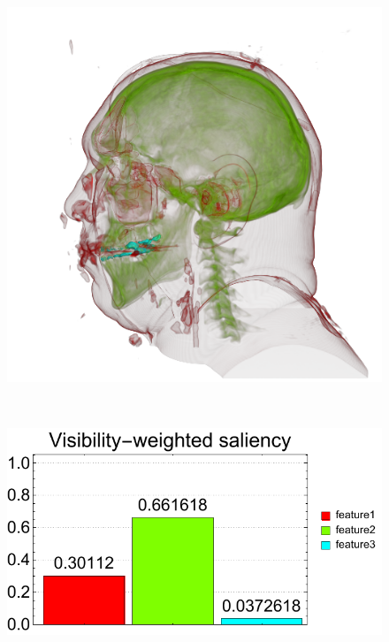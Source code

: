 \begin{figure}
	\centering
	\begin{minipage}{.24\textwidth}
		\includegraphics[width=1\linewidth]{images/vismale_week_green}
		\subcaption{}
	\end{minipage}~
	\begin{minipage}{.25\textwidth}
		\includegraphics[width=1\linewidth]{figures/vismale_week_green_visibility_saliency_weighted_chart}
		\subcaption{}
	\end{minipage}~
	\begin{minipage}{.24\textwidth}

\end{minipage}
\end{figure}
